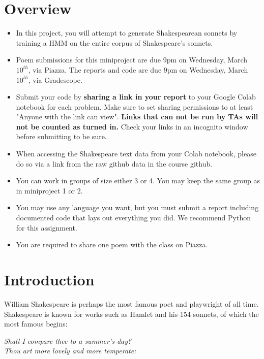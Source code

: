 



\pagestyle{fancy}
\section{Overview}
\begin{itemize}
\item In this project, you will attempt to generate Shakespearean sonnets by training a HMM on the entire corpus of Shakespeare's sonnets.

\item Poem submissions for this miniproject are due 9pm on Wednesday, March $10^{th}$, via Piazza. The reports and code are due 9pm on Wednesday, March $10^{th}$, via Gradescope.

\item Submit your code by \textbf{sharing a link in your report} to your Google Colab notebook for each problem. Make sure to set sharing permissions to at least "Anyone with the link can view". \textbf{Links that can not be run by TAs will not be counted as turned in.} Check your links in an incognito window before submitting to be sure.

\item When accessing the Shakespeare text data from your Colab notebook, please do so via a link from the raw github data in the course github.

\item You can work in groups of size either 3 or 4.  You may keep the same group as in miniproject 1 or 2.

\item You may use any language you want, but you must submit a report including documented code that lays out everything you did. We recommend Python for this assignment.

\item You are required to share one poem with the class on Piazza.

\end{itemize}

\section{Introduction}
William Shakespeare is perhaps the most famous poet and playwright of all time. Shakespeare is known for works such as Hamlet and his 154 sonnets, of which the most famous begins:
\begin{center}\emph{Shall I compare thee to a summer's day?\\
Thou art more lovely and more temperate:}\end{center}

